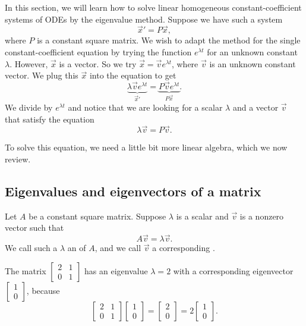 In this section, we will learn how to solve linear homogeneous
constant-coefficient systems of ODEs by the eigenvalue method.
Suppose we have such a system
\begin{equation*}
{\vec{x}}' = P\vec{x} ,
\end{equation*}
where
$P$ is a
constant square matrix.
We wish to
adapt the method for the single
constant-coefficient equation by trying the function $e^{\lambda t}$
for an unknown constant $\lambda$.
However, $\vec{x}$ is a vector.  So we try $\vec{x} = \vec{v} e^{\lambda t}$, where
$\vec{v}$ is an unknown constant vector.  We plug this $\vec{x}$ into the equation to get
\begin{equation*}
\underbrace{\lambda \vec{v} e^{\lambda t}}_{{\vec{x}}'} =
\underbrace{P\vec{v} e^{\lambda t}}_{P\vec{x}} .
\end{equation*}
We divide by $e^{\lambda t}$ and notice that we are looking for a scalar $\lambda$
and a vector $\vec{v}$ that satisfy the equation
\begin{equation*}
\lambda \vec{v} = P\vec{v} .
\end{equation*}

To solve this equation, we need a little bit more linear algebra, which we now
review.

\subsection{Eigenvalues and eigenvectors of a matrix}

Let $A$ be a constant square matrix.  Suppose
$\lambda$ is a scalar and
$\vec{v}$ is a nonzero vector such that
\begin{equation*}
A \vec{v} = \lambda \vec{v}.
\end{equation*}
We call such a $\lambda$ an \emph{} of $A$,
and we
call $\vec{v}$
a corresponding \emph{}.

\begin{example}
The matrix $\left[ \begin{smallmatrix}
2 & 1 \\
0 & 1
\end{smallmatrix} \right]$ has an eigenvalue $\lambda = 2$ with a
corresponding
eigenvector $\left[ \begin{smallmatrix}
1 \\ 0
\end{smallmatrix} \right]$, because
\begin{equation*}
\begin{bmatrix}
2 & 1 \\
0 & 1
\end{bmatrix}
\begin{bmatrix}
1 \\ 0
\end{bmatrix}
=
\begin{bmatrix}
2 \\
0 
\end{bmatrix}
=
2
\begin{bmatrix}
1 \\ 0
\end{bmatrix} .
\end{equation*}
\end{example}

